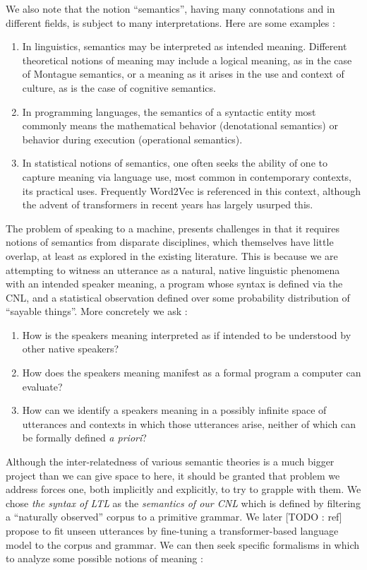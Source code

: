 \documentclass{article}
\begin{document}
We also note that the notion ``semantics'', having many connotations and
in different fields, is subject to many interpretations. Here
are some examples :

\begin{enumerate}
\item In linguistics, semantics may be interpreted as intended meaning.
Different theoretical notions of meaning may include a logical meaning, as in
the case of Montague semantics, or a meaning as it arises in the use and context
of culture, as is the case of cognitive semantics.
\item In programming languages, the semantics of a syntactic entity most
commonly means the mathematical behavior (denotational semantics) or behavior
during execution (operational semantics).
\item In statistical notions of semantics, one often seeks the ability of one to
capture meaning via language use, most common in contemporary contexts, its
practical uses. Frequently Word2Vec \cite{word2vec} is referenced in this context,
although the advent of transformers \cite{attnetion} in recent years has largely usurped this.
\end{enumerate}

The problem of speaking to a machine, presents challenges
in that it requires notions of semantics from disparate disciplines, which
themselves have little overlap, at least as explored in the existing literature.
This is because we are attempting to witness an utterance as a natural, native
linguistic phenomena with an intended speaker meaning, a program whose syntax is
defined via the CNL, and a statistical observation defined over some probability
distribution of ``sayable things''. More concretely we ask :

\begin{enumerate}
\item How is the speakers meaning interpreted as if intended to be understood by
 other native speakers?
\item How does the speakers meaning manifest as a formal program a computer can
 evaluate?
\item How can we identify a speakers meaning in a possibly infinite space of
 utterances and contexts in which those utterances arise, neither of which can
 be formally defined \emph{a priori}?
\end{enumerate}

Although the inter-relatedness of various semantic theories is a much bigger
project than we can give space to here, it should be granted that problem we
address forces one, both implicitly and explicitly, to try to grapple with them.
We chose \emph{the syntax of LTL} as the \emph{semantics of our CNL} which is
defined by filtering a ``naturally observed'' corpus to a primitive grammar. We
later [TODO : ref] propose to fit unseen utterances by fine-tuning a
transformer-based language model to the corpus and grammar. We can then seek
specific formalisms in which to analyze some possible notions of meaning :
\end{document}
